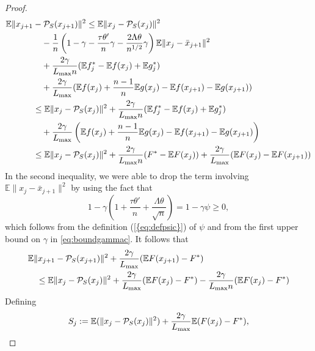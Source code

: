 \documentclass{siamltex}
\begin{document}
\begin{proof}
\begin{align}
\nonumber
{\mathbb{E}}\|x_{j+1} & - {\mathcal{P}_{S}}(x_{j+1})\|^2 \leq {\mathbb{E}} \|x_j - {\mathcal{P}_{S}}(x_j)\|^2 \\
\nonumber
& \quad - {1\over n}\left(1-\gamma - {\tau\theta' \over n}\gamma - {2\Lambda\theta \over n^{1/2}}\gamma\right){\mathbb{E}}\|x_j-\bar{x}_{j+1}\|^2 \\
\nonumber
&\quad +\frac{2\gamma}{{L_{\mbox{\rm\scriptsize max}}} n}({\mathbb{E}} f^*_j- {\mathbb{E}} f(x_j) + {\mathbb{E}} g^*_j) 
\\ \nonumber
& \quad  
+ \frac{2\gamma}{L_{\mbox{\rm\scriptsize max}}}({\mathbb{E}} f(x_j) + {n-1\over n}{\mathbb{E}} g(x_j) -  {\mathbb{E}} f(x_{j+1}) - {\mathbb{E}} g(x_{j+1}))  \\
\nonumber
&\leq {\mathbb{E}} \|x_j - {\mathcal{P}_{S}}(x_j)\|^2 + \frac{2\gamma}{{L_{\mbox{\rm\scriptsize max}}} n}({\mathbb{E}} f^*_j- {\mathbb{E}} f(x_j) + {\mathbb{E}} g^*_j) \\
\nonumber
&\quad 
+\frac{2\gamma}{L_{\mbox{\rm\scriptsize max}}}\left({\mathbb{E}} f(x_j) + {n-1\over n}{\mathbb{E}} g(x_j) -  {\mathbb{E}} f(x_{j+1}) - {\mathbb{E}} g(x_{j+1})\right) \\
\label{eqn_proof2_7_5}
&\leq {\mathbb{E}} \|x_j - {\mathcal{P}_{S}}(x_j)\|^2 + \frac{2\gamma}{{L_{\mbox{\rm\scriptsize max}}} n}(F^*- {\mathbb{E}} F(x_j)) + \frac{2\gamma}{L_{\mbox{\rm\scriptsize max}}}({\mathbb{E}} F(x_j) -  {\mathbb{E}} F(x_{j+1}) )
\end{align}
In the second inequality, we were able to drop the term involving ${\mathbb{E}}
\|x_j-\bar{x}_{j+1}\|^2$ by using the fact that
\[
1-\gamma\left(1+\frac{\tau\theta'}{n} + \frac{\Lambda \theta}{\sqrt{n}}\right) = 1 - \gamma\psi \geq 0,
\]
which follows from the definition {(\ref{{eq:defpsic}})} of $\psi$ and
from the first upper bound on $\gamma$ in \eqref{eq:boundgammac}.  It
follows that
\begin{align}
\nonumber
&{\mathbb{E}}\|x_{j+1} - {\mathcal{P}_{S}}(x_{j+1})\|^2 + \frac{2\gamma}{L_{\mbox{\rm\scriptsize max}}}({\mathbb{E}} F(x_{j+1}) -F^*) \\
\label{eq:crap6}
&\quad \leq  {\mathbb{E}} \|x_j - {\mathcal{P}_{S}}(x_j)\|^2 + \frac{2\gamma}{L_{\mbox{\rm\scriptsize max}}}({\mathbb{E}} F(x_j) - F^*) - \frac{2\gamma}{L_{\max}n}( {\mathbb{E}} F(x_j)- F^*) 
\end{align}
Defining
\begin{equation} \label{eq:defsj}
S_j:={\mathbb{E}} (\|x_j-{\mathcal{P}_{S}}(x_j)\|^2) + {2\gamma \over {L_{\mbox{\rm\scriptsize max}}}}{\mathbb{E}} (F(x_j)-F^*),

\end{equation}
\end{proof}
\end{document}
